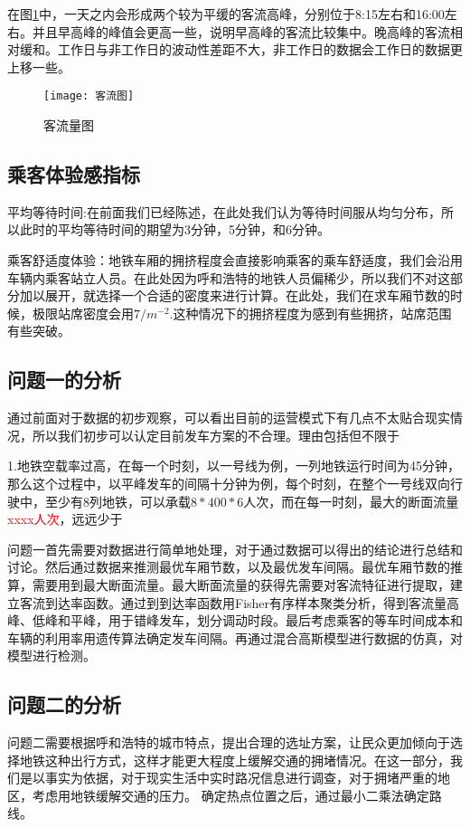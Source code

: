 \documentclass[12pt,a4paper]{mcmthesis}
\begin{document}
在图\ref{fig:客流量}中，一天之内会形成两个较为平缓的客流高峰，分别位于8:15左右和16:00左右。并且早高峰的峰值会更高一些，说明早高峰的客流比较集中。晚高峰的客流相对缓和。工作日与非工作日的波动性差距不大，非工作日的数据会工作日的数据更上移一些。

\begin{figure}[h!t]
	\centerline{\texttt{[image: 客流图]}\quad
	}
	\caption{\song\wuhao
		客流量图}
	\label{fig:客流量}
\end{figure}

\subsection{乘客体验感指标}
平均等待时间:在前面我们已经陈述，在此处我们认为等待时间服从均匀分布，所以此时的平均等待时间的期望为3分钟，5分钟，和6分钟。

乘客舒适度体验：地铁车厢的拥挤程度会直接影响乘客的乘车舒适度，我们会沿用车辆内乘客站立人员。在此处因为呼和浩特的地铁人员偏稀少，所以我们不对这部分加以展开，就选择一个合适的密度来进行计算。在此处，我们在求车厢节数的时候，极限站席密度会用$7/m^{-2}$.这种情况下的拥挤程度为感到有些拥挤，站席范围有些突破。

\subsection{问题一的分析}

 通过前面对于数据的初步观察，可以看出目前的运营模式下有几点不太贴合现实情况，所以我们初步可以认定目前发车方案的不合理。理由包括但不限于

 1.地铁空载率过高，在每一个时刻，以一号线为例，一列地铁运行时间为45分钟，那么这个过程中，以平峰发车的间隔十分钟为例，每个时刻，在整个一号线双向行驶中，至少有8列地铁，可以承载$8*400*6$人次，而在每一时刻，最大的断面流量\textcolor{red}{xxxx人次}，远远少于



 {问题一首先需要对数据进行简单地处理，对于通过数据可以得出的结论进行总结和讨论。然后通过数据来推测最优车厢节数，以及最优发车间隔。最优车厢节数的推算，需要用到最大断面流量。最大断面流量的获得先需要对客流特征进行提取，建立客流到达率函数。通过到到达率函数用Fisher有序样本聚类分析，得到客流量高峰、低峰和平峰，用于错峰发车，划分调动时段。最后考虑乘客的等车时间成本和车辆的利用率用遗传算法确定发车间隔。再通过混合高斯模型进行数据的仿真，对模型进行检测。}


\subsection{问题二的分析}
问题二需要根据呼和浩特的城市特点，提出合理的选址方案，让民众更加倾向于选择地铁这种出行方式，这样才能更大程度上缓解交通的拥堵情况。在这一部分，我们是以事实为依据，对于现实生活中实时路况信息进行调查，对于拥堵严重的地区，考虑用地铁缓解交通的压力。
确定热点位置之后，通过最小二乘法确定路线。
\end{document}
